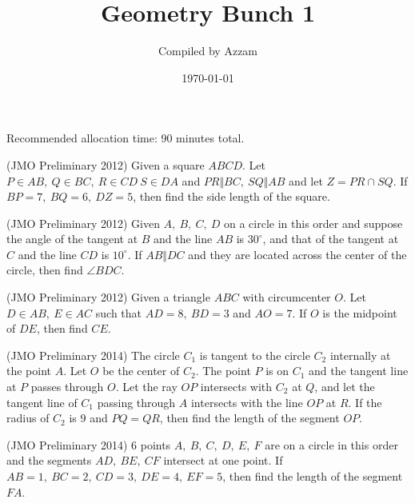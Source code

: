 \documentclass[12pt]{scrartcl}
\begin{document}
	\title{Geometry Bunch 1} %
	\date{\today}
	\author{Compiled by Azzam}
	\maketitle

\renewcommand*\contentsname{Daftar Isi}
\tableofcontents

\newpage
	
	Recommended allocation time: 90 minutes total.
	
	\begin{soalbaru}
	(JMO Preliminary 2012) Given a square $ABCD$. Let $P\in{AB},\ Q\in{BC},\ R\in{CD}\ S\in{DA}$ and $PR\Vert BC,\ SQ\Vert AB$ and let $Z=PR\cap SQ$. If $BP=7,\ BQ=6,\ DZ=5$, then find the side length of the square.
	\end{soalbaru}
	
    \begin{soalbaru}
    (JMO Preliminary 2012)  Given $A,\ B,\ C,\ D$ on a circle in this order and suppose the angle of the tangent at $B$ and the line $AB$ is $30^\circ$, and that of the tangent at $C$ and the line $CD$ is $10^\circ$. If $AB\Vert DC$ and they are located across the center of the circle, then find $\angle{BDC}$.
    \end{soalbaru}
    
    \begin{soalbaru}
    (JMO Preliminary 2012) Given a triangle $ABC$ with circumcenter $O$. Let $D\in{AB},\ E\in{AC}$ such that $AD=8,\ BD=3$ and $AO=7$. If $O$ is the midpoint of $DE$, then find $CE$.
    \end{soalbaru}
    
    \begin{soalbaru}
    (JMO Preliminary 2014) The circle $C_1$ is tangent to the circle $C_2$ internally at the point $A$. Let $O$ be the center of $C_2$. The point $P$ is on $C_1$ and the tangent line at $P$ passes through $O$. Let the ray $OP$ intersects with $C_2$ at $Q$, and let the tangent line of $C_1$ passing through $A$ intersects with the line $OP$ at $R$. If the radius of $C_2$ is 9 and $PQ=QR$, then find the length of the segment $OP$. %
    \end{soalbaru}
    
    \begin{soalbaru}
    (JMO Preliminary 2014) 6 points $A,\ B,\ C,\ D,\ E,\ F$ are on a circle in this order and the segments $AD,\ BE,\ CF$ intersect at one point. If $AB=1,\ BC=2,\ CD=3,\ DE=4,\ EF=5$, then find the length of the segment $FA$.
    \end{soalbaru}
    
\end{document}

